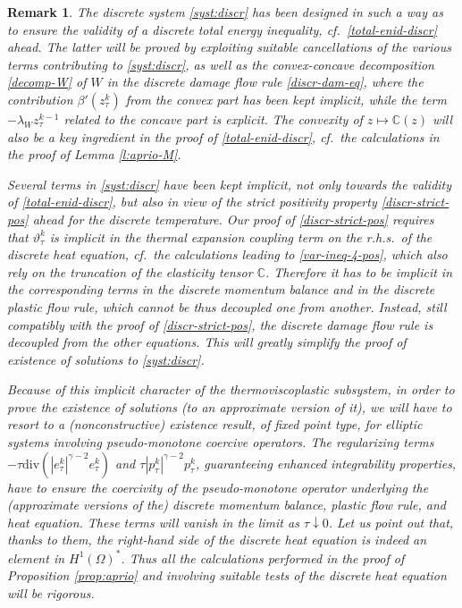 \documentclass[a4paper,10pt,reqno]{amsart}
\numberwithin{equation}{section}
\numberwithin{equation}{section}
\newtheorem{remark}[theorem]{Remark}
\newcommand{\teta}{\vartheta}
\newcommand{\bbC}{\mathbb{C}}
\newcommand{\ptau}[1]{p_\tau^{#1}}
\newcommand{\ztau}[1]{z_\tau^{#1}}
\newcommand{\etau}[1]{e_\tau^{#1}}
\newcommand{\tetau}[1]{\teta_\tau^{#1}}
\begin{document}
\begin{remark}
\label{rmk:tech-comments}
\upshape
The discrete system \eqref{syst:discr} has been designed in such a way as to ensure the validity of
 a discrete total energy inequality, cf.\ \eqref{total-enid-discr} ahead.  The latter  will be proved by exploiting
  suitable cancellations 
   of the various terms contributing to  \eqref{syst:discr}, as well as 
  the  convex-concave decomposition
  \eqref{decomp-W} of $W$
   in the  discrete damage flow rule \eqref{discr-dam-eq}, where the contribution $\beta'(\ztau k)$ from the convex part has been kept implicit, 
   while the term $-\lambda_W \ztau{k-1}$ related to the concave part is explicit. 
The convexity of $z\mapsto {\bbC}(z)$ will also be a  key ingredient in the proof of  \eqref{total-enid-discr}, cf.\ the calculations in the proof of Lemma \ref{l:aprio-M}. 
\par
Several terms in  \eqref{syst:discr} have been kept \emph{implicit}, not only towards the validity   of \eqref{total-enid-discr}, but also in view of the strict positivity property \eqref{discr-strict-pos} ahead for the discrete temperature. Our proof  of \eqref{discr-strict-pos}  requires that $\tetau k$ is implicit in the  thermal expansion coupling term on the r.h.s.\ of the discrete heat equation,
cf.\ the calculations leading to \eqref{var-ineq-4-pos}, which also rely on the truncation of the elasticity tensor $\bbC$. 
 Therefore it has to be  implicit
in the corresponding terms in the discrete momentum balance and in the discrete plastic flow rule, which cannot  be thus  decoupled one from another. 
Instead, still compatibly with the proof of \eqref{discr-strict-pos},  the discrete damage flow rule  is decoupled from the other equations.
 This will greatly simplify the proof of existence of solutions to   \eqref{syst:discr}.
\par Because of this implicit character of the thermoviscoplastic subsystem, in order to prove the existence of solutions (to an approximate version of it),
we will have to resort to a (nonconstructive) existence result, of fixed point type, for elliptic systems
involving pseudo-monotone coercive operators. 
 The regularizing terms
 $-\tau \mathrm{div}(|\etau k|^{\gamma- 2} \etau k)$ and   $\tau |\ptau k|^{\gamma-2} \ptau k$, 
  guaranteeing enhanced integrability properties, have to ensure the coercivity of the pseudo-monotone operator
underlying the (approximate versions of  the) 
discrete momentum balance, plastic flow rule, and heat equation.
These terms will vanish in the limit as $\tau\downarrow 0$.
Let us point out that, thanks to them, the right-hand side  of the discrete heat equation is indeed an element in $H^1(\Omega)^*$.
Thus all the calculations 
performed in the proof of Proposition  \ref{prop:aprio}  and involving suitable tests of the discrete heat equation  will be rigorous. 
\end{remark}
\end{document}
